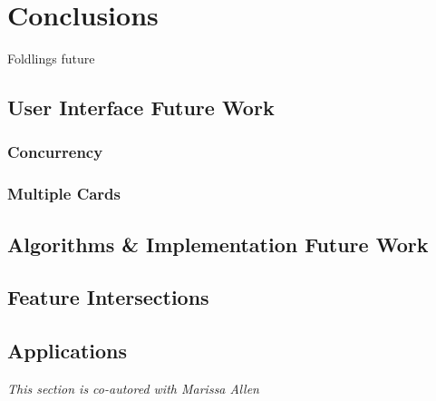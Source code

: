\chapter{Conclusions}

Foldlings future

\section{User Interface Future Work}\label{user-interface-future-work}

\subsection{Concurrency}\label{concurrency}

\subsection{Multiple Cards}\label{multiple-cards}

\section{Algorithms \& Implementation Future
Work}\label{algorithms-implementation-future-work}

\section{Feature Intersections}\label{feature-intersections}

\section{Applications}\label{applications}

\emph{This section is co-autored with Marissa Allen}
